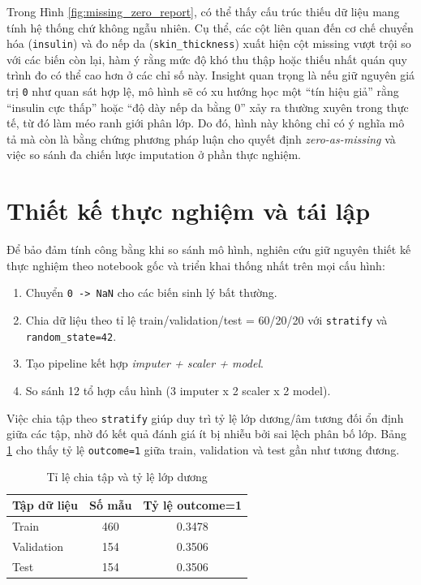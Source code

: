 \noindent
Trong Hình \ref{fig:missing_zero_report}, có thể thấy cấu trúc thiếu dữ liệu mang tính hệ thống chứ không ngẫu nhiên.
Cụ thể, các cột liên quan đến cơ chế chuyển hóa (\texttt{insulin}) và đo nếp da (\texttt{skin\_thickness}) xuất hiện cột missing vượt trội so
với các biến còn lại, hàm ý rằng mức độ khó thu thập hoặc thiếu nhất quán quy trình đo có thể cao hơn ở các chỉ số này.
Insight quan trọng là nếu giữ nguyên giá trị \texttt{0} như quan sát hợp lệ, mô hình sẽ có xu hướng học một ``tín hiệu giả'' rằng
``insulin cực thấp'' hoặc ``độ dày nếp da bằng 0'' xảy ra thường xuyên trong thực tế, từ đó làm méo ranh giới phân lớp.
Do đó, hình này không chỉ có ý nghĩa mô tả mà còn là bằng chứng phương pháp luận cho quyết định \textit{zero-as-missing} và việc
so sánh đa chiến lược imputation ở phần thực nghiệm.

\section{Thiết kế thực nghiệm và tái lập}
Để bảo đảm tính công bằng khi so sánh mô hình, nghiên cứu giữ nguyên thiết kế thực nghiệm theo notebook gốc
và triển khai thống nhất trên mọi cấu hình:
\begin{enumerate}[leftmargin=1.8em]
    \item Chuyển \texttt{0 -> NaN} cho các biến sinh lý bất thường.
    \item Chia dữ liệu theo tỉ lệ train/validation/test = 60/20/20 với \texttt{stratify}
    và \texttt{random\_state=42}.
    \item Tạo pipeline kết hợp \textit{imputer + scaler + model}.
    \item So sánh 12 tổ hợp cấu hình (3 imputer x 2 scaler x 2 model).
\end{enumerate}

\noindent
Việc chia tập theo \texttt{stratify} giúp duy trì tỷ lệ lớp dương/âm tương đối ổn định giữa các tập, nhờ đó
kết quả đánh giá ít bị nhiễu bởi sai lệch phân bố lớp. Bảng \ref{tab:data_split} cho thấy tỷ lệ \texttt{outcome=1}
giữa train, validation và test gần như tương đương.

\begin{table}[H]
\centering
\caption{Tỉ lệ chia tập và tỷ lệ lớp dương}
\label{tab:data_split}
\begin{tabular}{lcc}
\toprule
\textbf{Tập dữ liệu} & \textbf{Số mẫu} & \textbf{Tỷ lệ outcome=1}\\
\midrule
Train & 460 & 0.3478\\
Validation & 154 & 0.3506\\
Test & 154 & 0.3506\\
\bottomrule
\end{tabular}
\end{table}


